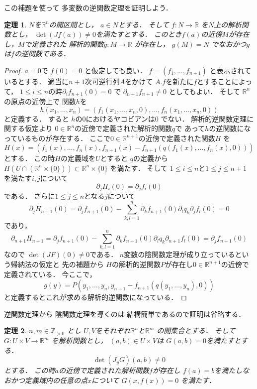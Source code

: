 \documentclass[leqno, a4paper, 12pt]{jsarticle}
\newtheorem{thm}{定理}
\newcommand{\zz}{\mathbb{Z}}
\newcommand{\rr}{\mathbb{R}}
\begin{document}
この補題を使って
多変数の逆関数定理を証明しよう．
\begin{thm}
$N$を$\rr^{n}$の開区間とし，
$a\in N$とする．
そして
$f: N\to \rr$
を$N$上の解析関数とし，
$\det(Jf(a))\neq 0$を満たすとする．
このとき$f(a)$の近傍$M$が存在し，$M$で定義された
解析的関数$g:M\to \rr$
が存在し， $g(M)= N$
でなおかつ$g$は$f$の逆関数である．

\end{thm}

\begin{proof}
$a=0$で $f(0)=0$
と仮定しても良い．
$f=(f_1, \dots, f_{n+1})$
と表示されているとする．
適当に$n+1$次可逆行列$A$をかけて
$A.f$を新たに$f$とすることによって，
$1\le i\le n$の時$\partial_{i}f_{n+1}(0)=0$
で
$\partial_{n+1}f_{n+1}\neq 0$
としてもよい．
そして
$\rr^{n}$の原点の近傍上で
関数$h$を
\[
h(x_1, \dots, x_n)=( f_1(x_1, \dots, x_n, 0), \dots, f_n(x_1, \dots, x_n, 0))
\]
と定義する．
すると
$h$の$0$におけるヤコビアンは$0$
でない．
解析的逆関数定理に関する仮定より
$0\in \rr^n$の近傍で定義された解析的関数$q$で
あって$h$の逆関数になっているものが存在する．
ここで$0\in \rr^{n+1}$の近傍で定義された関数$H$
を
\[
H(x)=
(f_1(x), \dots, f_n(x), 
f_{n+1}(x)-f_{n+1}(q(f_1(x), \dots, f_n(x), 0))
)
\]
とする．
この時$H$の定義域を$U$とすると
$q$の定義から
$H(U\cap (\rr^n\times \{0\}))\subset \rr^n\times \{0\}$
を満たす．
そして
$1\le i\le n$と$1\le j\le n+1$
を満たす$i, j$について
\[
\partial_{j}H_i(0)=\partial_{j}f_{i}(0)
\]
である．
さらに$1\le j\le n$となる$j$について
\[
\partial_{j}H_{n+1}(0)=
\partial_{j}f_{n+1}(0)-\sum_{k, l=1}^n\partial_{k}f_{n+1}(0)
\partial_{l}q_k\partial_{j}f_{l}(0)=0
\]
であり，
\[
\partial_{n+1}H_{n+1}=
\partial_{j}f_{n+1}(0)-\sum_{k, l=1}^n\partial_{k}f_{n+1}(0)
\partial_{l}q_k\partial_{n+1}f_{l}(0)
=
\partial_{j}f_{n+1}(0)
\]
なので
$\det(JF)(0)\neq 0$である．
$n$変数の陰関数定理が成り立っているという帰納法の仮定と
先の補題から
$H$の解析的逆関数$P$が存在し$0\in \rr^{n+1}$の近傍で定義されている．
今ここで，
\[
g(y)=P(y_1, \dots, y_n, y_{n+1}-f_{n+1}(q(y_1, \dots, y_n), 0))
\]
と定義するとこれが求める解析的逆関数になっている．
\end{proof}

逆関数定理から
陰関数定理を導くのは
結構簡単であるので証明は省略する．
\begin{thm}
$n, m\in \zz_{>0}$
とし
$U, V$をそれぞれ$\rr^n$と$\rr^m$
の開集合とする．
そして
$G: U\times V\to \rr^{m}$
を解析関数とし，
$(a, b)\in U\times V$は
$G(a, b)=0$を満たすとする．
\[
\det(J_{y}G)(a, b)\neq 0
\]
とする．
この時$a$の近傍で定義された解析関数$f$が存在し
$f(a)=b$を満たしなおかつ定義域内の任意の点$x$について
$G(x, f(x))=0$
を満たす．

\end{thm}
\end{document}
